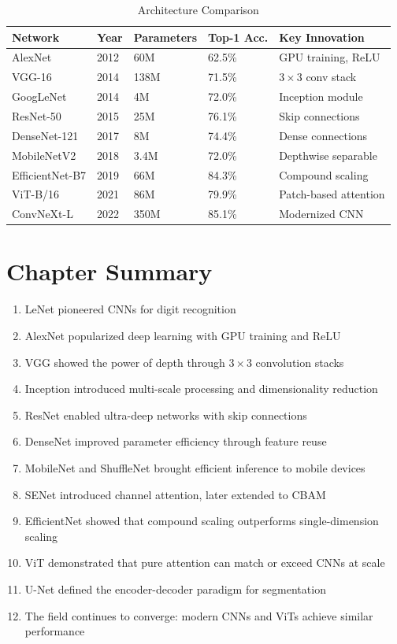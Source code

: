 \begin{table}[ht]
    \centering
    \caption{Architecture Comparison}
    \begin{tabular}{L{2.5cm} L{1.5cm} L{2cm} L{2.5cm} L{3cm}}
        \toprule
        \textbf{Network} & \textbf{Year} & \textbf{Parameters} & \textbf{Top-1 Acc.} & \textbf{Key Innovation} \\
        \midrule
        AlexNet & 2012 & 60M & 62.5\% & GPU training, ReLU \\
        VGG-16 & 2014 & 138M & 71.5\% & $3\times3$ conv stack \\
        GoogLeNet & 2014 & 4M & 72.0\% & Inception module \\
        ResNet-50 & 2015 & 25M & 76.1\% & Skip connections \\
        DenseNet-121 & 2017 & 8M & 74.4\% & Dense connections \\
        MobileNetV2 & 2018 & 3.4M & 72.0\% & Depthwise separable \\
        EfficientNet-B7 & 2019 & 66M & 84.3\% & Compound scaling \\
        ViT-B/16 & 2021 & 86M & 79.9\% & Patch-based attention \\
        ConvNeXt-L & 2022 & 350M & 85.1\% & Modernized CNN \\
        \bottomrule
    \end{tabular}
\end{table}

\section{Chapter Summary}

\begin{enumerate}
    \item LeNet pioneered CNNs for digit recognition
    \item AlexNet popularized deep learning with GPU training and ReLU
    \item VGG showed the power of depth through $3\times3$ convolution stacks
    \item Inception introduced multi-scale processing and dimensionality reduction
    \item ResNet enabled ultra-deep networks with skip connections
    \item DenseNet improved parameter efficiency through feature reuse
    \item MobileNet and ShuffleNet brought efficient inference to mobile devices
    \item SENet introduced channel attention, later extended to CBAM
    \item EfficientNet showed that compound scaling outperforms single-dimension scaling
    \item ViT demonstrated that pure attention can match or exceed CNNs at scale
    \item U-Net defined the encoder-decoder paradigm for segmentation
    \item The field continues to converge: modern CNNs and ViTs achieve similar performance
\end{enumerate}

